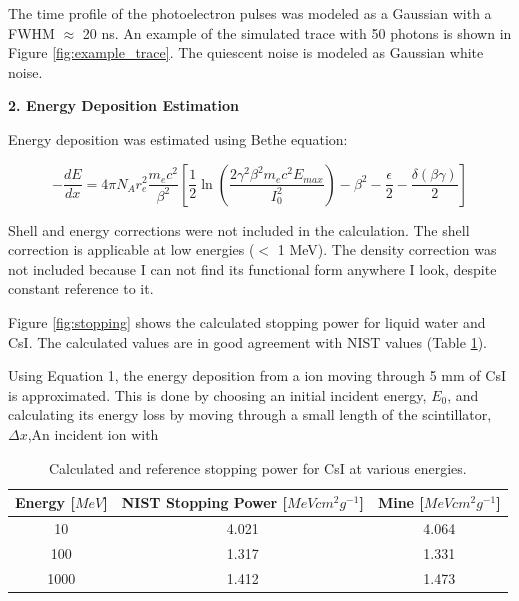 \documentclass[11pt]{article}
\begin{document}
	The time profile of the photoelectron pulses was modeled as a Gaussian with a FWHM $\approx$ 20 ns. An example of the simulated trace with 50 photons is shown in Figure \ref{fig:example_trace}. The quiescent noise is modeled as Gaussian white noise.

	{\bf 2. Energy Deposition Estimation}
	
	Energy deposition was estimated using Bethe equation:
	\begin{center}
		\begin{equation}
			-\frac{dE}{dx}=4\pi N_{A} r_{e}^{2} \frac{m_{e}c^{2}}{\beta^{2}}[\frac{1}{2}\ln(\frac{2 \gamma^{2}\beta^{2}m_{e}c^{2}E_{max}}{I_{0}^{2}})-\beta^{2}-\frac{\epsilon}{2}-\frac{\delta(\beta\gamma)}{2}]
		\end{equation}
	\end{center}

	Shell and energy corrections were not included in the calculation. The shell correction is applicable at low energies ($<$ 1 MeV). The density correction was not included because I can not find its functional form anywhere I look, despite constant reference to it.
	
	Figure \ref{fig:stopping} shows the calculated stopping power for liquid water and CsI. The calculated values are in good agreement with NIST values (Table \ref{table:stopTable}).
	
	Using Equation 1, the energy deposition from a ion moving through 5 mm of CsI is approximated. This is done by choosing an initial incident energy, $E_0$, and calculating its energy loss by moving through a small length of the scintillator, $\Delta x$,An incident ion with
	
	\begin{table}
		
		\centering
		\begin{tabular}{c c c}
			\hline\hline
			Energy [$MeV$]  & NIST Stopping Power [$MeV cm^{2} g^{-1}$] & Mine [$MeV cm^{2} g^{-1}$] \\
			\hline
			10 & 4.021 & 4.064 \\
			100 & 1.317 & 1.331 \\
			1000 & 1.412 & 1.473 \\
			\hline
		\end{tabular}
		\caption{Calculated and reference stopping power for CsI at various energies.}
		\label{table:stopTable}
	\end{table}
	
	
	
\end{document}
